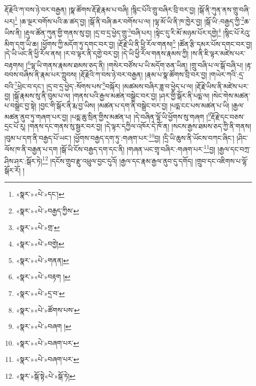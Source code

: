 རྡོ་རྗེའི་ཀ་བས་ཉེ་བར་བརྒྱན། །སྣ་ཚོགས་རྡོ་རྗེ་རྣམ་པ་བཞི། །སྙིང་པོའི་གྲུ་བཞིར་བྲི་བར་བྱ། །སྒོ་ནི་ཀུན་ནས་གྲུ་བཞི་པར།\footnote{«སྣར་»«པེ་»དང་།} །ཆ་ལྔར་བགོས་པའི་ཆ་ཚད་བྱ། །སྒོ་ནི་བཞི་ཆར་བགོས་པ་ལ། །ལྷ་མོ་ཡི་ནི་ཁ་ཁྱེར་བྱ། །སྒོ་ཡི་:བརྒྱད་ཀྱི་\footnote{«སྣར་»«པེ་»བརྒྱད་ཀྱིས་}ཆ་ཡིས་ནི། །རྡུལ་ཚོན་ཀུན་གྱི་གནས་སུ་བྱ། །དྲ་བ་དྲ་ཕྱེད་གྲུ་\footnote{«སྣར་»«པེ་»གྲ་}བཞི་པར། །སྟེང་དུ་རི་མོ་མཉམ་པོར་དགྱེ།\footnote{«སྣར་»«པེ་»བགྱེ།} །སྙིང་པོ་རེའུ་མིག་དགུ་ཡི་ཆ། །ཕྱོགས་ཀྱི་མདོག་ཏུ་དགང་བར་བྱ། །རྡོ་རྗེ་ཡི་ནི་ཕྱི་རོལ་གནས།\footnote{«སྣར་»«པེ་»གནན།} །ཚོན་རྩི་དམར་པོས་དགང་བར་བྱ། །དེ་ཡི་ཡང་ནི་ཕྱི་རོལ་ནས། །ར་བ་ལྟར་ནི་དགྱེ་བར་བྱ། །དེ་ཡི་ཕྱི་རོལ་གནས་རྣམས་ཀྱི། །ས་ནི་ཇི་ལྟར་མཛེས་པར་བརྟགས། །\footnote{«སྣར་»«པེ་»བརྟག །}ལྷ་ཡི་གནས་རྣམས་ཐམས་ཅད་ནི། །གསེར་བཙོས་པ་ཡི་མདོག་ཅན་ཡིན། །གྲུ་བཞི་པ་ལ་སྒོ་བཞི་པ། །རྟ་བབས་བཞིས་ནི་རྣམ་པར་ཀླུབས། །རྡོ་རྗེའི་ཀ་བས་ཉེ་བར་བརྒྱན། །རྣམ་པ་སྣ་ཚོགས་བྲི་བར་བྱ། །གཡེར་ཀའི་:དྲ་བའི་\footnote{«སྣར་»«པེ་»དྲ་བ་}ཕྲེང་བ་དང་། །དྲ་བ་དྲ་ཕྱེད་:སོགས་པས་\footnote{«སྣར་»«པེ་»ཚོགས་པས་}བསྐོར། །མཚམས་བཞིར་ཟླ་བ་ཕྱེད་པ་ལ། །རྡོ་རྗེ་ཡིས་ནི་མཛེས་པར་བྱ། །སྒོ་རྣམས་སུ་ནི་བུམ་པ་ལ། །གནས་པའི་རྒྱལ་མཚན་བསྒྲེང་བར་བྱ། །ཤར་གྱི་སྒོར་ནི་པདྨ་ལ། །སེང་གེས་མཚན་པ་བསྒྲེང་བྱ་སྟེ། །བྱང་གི་སྒོར་ནི་རྨ་བྱ་ཡིས། །མཚན་པ་དག་ནི་བསྒྲེང་བར་བྱ། །པདྨ་ངང་པས་མཚན་པ་ཡི། །རྒྱལ་མཚན་ནུབ་ཏུ་གཞག་པར་བྱ། །པདྨ་ཆུ་སྲིན་གྱིས་མཚན་པ། །དེ་བཞིན་ལྷོ་ཡི་ཕྱོགས་སུ་གཞག །\footnote{«སྣར་»«པེ་»བཞག །}རྡོ་རྗེ་དང་བཅས་དྲང་པོ་རུ། །གནས་དང་གནས་སུ་སྦྱར་བར་བྱ། །དེ་ལྟར་དཀྱིལ་འཁོར་དེ་ཁོ་ན། །སངས་རྒྱས་ཐམས་ཅད་ཀྱི་ནི་གནས། །བུམ་པ་དག་ནི་བརྒྱད་པོ་ཡང་། །ཕྱོགས་བརྒྱད་དག་ཏུ་:གཞག་པར་\footnote{«སྣར་»«པེ་»བཞག་པར་}བྱ། །དྲི་ཡི་ཆུས་ནི་ཡོངས་བཀང་ཞིང་། །ཤིང་ལོས་ཁ་ནི་བརྒྱན་པ་དག །སྒོ་ཡི་ངོས་བརྒྱད་དག་དང་ནི། །གཞན་ཡང་གྲྭ་བཞིར་:གཞག་པར་\footnote{«སྣར་»«པེ་»བཞག་པར་}བྱ། །རྒྱལ་དང་བཀྲ་ཤིས་ཤར་:སྒོར་ཏེ།\footnote{«སྣར་»སྒོ་སྟེ«པེ་»སྒོ་ཏེ།} །དངོས་གྲུབ་རྫུ་འཕྲུལ་བྱང་དུའོ། །རྒྱལ་དང་རྣམ་རྒྱལ་ནུབ་དུ་དགོད། །གྲུབ་དང་འཇིགས་པ་ལྷོ་སྒོར་རོ། །
